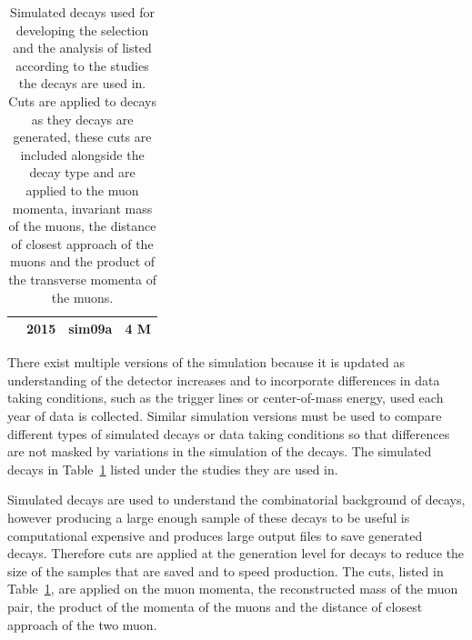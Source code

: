 \begin{table}[htb]
\begin{center}
\begin{tabular}{p{}p{}p{}p{}}
{{        		& 2015	& sim09a   		& 4 M \\  \hline
\end{tabular}
\vspace{0.7cm}
\caption{Simulated decays used for developing the selection and the analysis of \bsmumu listed according to the studies the decays are used in. Cuts are applied to \bbbarmumux decays as they decays are generated, these cuts are included alongside the decay type and are applied to the muon momenta, invariant mass of the muons, the distance of closest approach of the muons and the product of the transverse momenta of the muons.}
\label{tab:MC_decays}
\end{center}
\end{table}

There exist multiple versions of the simulation because it is updated as understanding of the detector increases and to incorporate differences in data taking conditions, such as the trigger lines or center-of-mass energy, used each year of data is collected. Similar simulation versions must be used to compare different types of simulated decays or data taking conditions so that differences are not masked by variations in the simulation of the decays. The simulated decays in Table~\ref{tab:MC_decays} listed under the studies they are used in. 

Simulated \bbbarmumux decays are used to understand the combinatorial background of \bsmumu decays, however producing a large enough sample of these decays to be useful is computational expensive and produces large output files to save generated decays. Therefore cuts are applied at the generation level for \bbbarmumux decays to reduce the size of the samples that are saved and to speed production. The cuts, listed in Table~\ref{tab:MC_decays}, are applied on the muon momenta, the reconstructed mass of the muon pair, the product of the momenta of the muons and the distance of closest approach of the two muon. %
  

